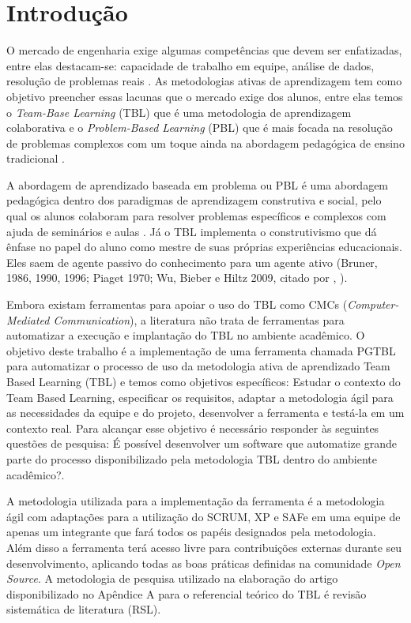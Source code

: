 \chapter*[Introdução]{Introdução}

O mercado de engenharia exige algumas competências que devem ser enfatizadas, entre elas destacam-se: capacidade de
trabalho em equipe, análise de dados, resolução de problemas reais \cite{davis}. As metodologias ativas de aprendizagem
tem como objetivo preencher essas lacunas que o mercado exige dos alunos, entre elas temos o \textit{Team-Base Learning}
(TBL) que é uma metodologia de aprendizagem colaborativa e o \textit{Problem-Based Learning} (PBL) que é mais focada na resolução de problemas complexos com um toque ainda na abordagem pedagógica de ensino tradicional \cite{cabrera}.

A abordagem de aprendizado baseada em problema ou PBL é uma abordagem pedagógica dentro dos paradigmas de aprendizagem
construtiva e social, pelo qual os alunos colaboram para resolver problemas específicos e complexos com ajuda de
seminários e aulas \cite{gomez}. Já o TBL implementa o construtivismo que dá ênfase no papel do aluno como mestre de
suas próprias experiências educacionais. Eles saem de agente passivo do conhecimento para um agente ativo (Bruner, 1986,
1990, 1996; Piaget 1970; Wu, Bieber e Hiltz 2009, citado por \citeauthor{gomez}, \citeyear{gomez}).

Embora existam ferramentas para apoiar o uso do TBL como CMCs (\textit{Computer-Mediated Communication}), a literatura não trata de ferramentas para automatizar a execução e implantação do TBL no ambiente acadêmico. O objetivo deste trabalho é a implementação de uma ferramenta chamada PGTBL para automatizar o processo de uso da metodologia ativa de aprendizado Team Based Learning (TBL) e temos como objetivos específicos: Estudar o contexto do Team Based Learning, especificar os requisitos, adaptar a metodologia ágil para as necessidades da equipe e do projeto, desenvolver a ferramenta e testá-la em um contexto real. Para alcançar esse objetivo é necessário responder às seguintes questões de pesquisa: É possível desenvolver um software que automatize grande parte do processo disponibilizado pela metodologia TBL dentro do ambiente acadêmico?.

A metodologia utilizada para a implementação da ferramenta é a metodologia ágil com adaptações para a utilização do SCRUM, XP e SAFe em uma equipe de apenas um integrante que fará todos os papéis designados pela metodologia. Além disso a ferramenta terá acesso livre para contribuições externas durante seu desenvolvimento, aplicando todas as boas práticas definidas na comunidade \textit{Open Source}. A metodologia de pesquisa utilizado na elaboração do artigo disponibilizado no Apêndice A para o referencial teórico do TBL é revisão sistemática de literatura (RSL).

